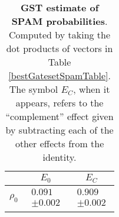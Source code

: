 \documentclass{article}[11pt]
\begin{document}
\begin{table}[h]
\begin{center}
\begin{tabular}[l]{|c|c|c|}
\hline
 & $E_{0}$ & $E_C$ \\ \hline
$\rho_{0}$ & $ \begin{array}{c} 0.091 \\ \pm 0.002 \end{array} $ & $ \begin{array}{c} 0.909 \\ \pm 0.002 \end{array} $ \\ \hline
\end{tabular}

\caption{\textbf{GST estimate of SPAM probabilities}.  Computed by taking the dot products of vectors in Table \ref{bestGatesetSpamTable}.  The symbol $E_C$, when it appears, refers to the ``complement'' effect given by subtracting each of the other effects from the identity.\label{bestGatesetSpamParametersTable}}
\end{center}
\end{table}
\end{document}
